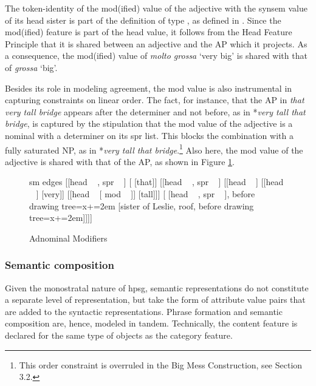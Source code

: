 \documentclass[output=paper]{langsci/langscibook}
\begin{document}
\noindent
The token-identity of the {\sc mod(ified)} value of the adjective
with the {\sc synsem} value of its head sister is part of the 
definition of type , as defined in . 
Since the {\sc mod(ified)} feature is part of the {\sc head} value, it follows from the 
Head Feature Principle that it is shared between an adjective 
and the AP which it projects. As a consequence, the {\sc mod(ified)} value of 
\emph{molto grossa} `very big' is shared with that of \emph{grossa} `big'. 
 
Besides its role in modeling agreement, the {\sc mod} value is also instrumental 
in capturing constraints on linear order.  
The fact, for instance, that the AP in \emph{that very tall bridge} appears 
after the determiner and not before, as in *\emph{very tall that bridge},
is captured by the stipulation that the {\sc mod} value of the adjective 
is a nominal with a determiner on its {\sc spr} list. This blocks the 
combination with a fully saturated NP, as in 
*\emph{very tall that bridge}.\footnote{This order constraint is overruled in 
the Big Mess Construction, see Section 3.2.} Also here, the {\sc mod} value of 
the adjective is shared with that of the AP, as shown in Figure \ref{lea}. 

\begin{figure}
	\centering
	\begin{forest}
sm edges
[{[{\sc head} ~  , {\sc spr} ~ \eliste]}
	[ [that]]
	[{[{\sc head} ~ , {\sc spr} ~ ]}
		[{[{\sc head} ~ ]}
			[{[{\sc head} ~ ]} [very]]
			[{[{\sc head} ~  [ {\sc mod} ~ ]]} [tall]]]
		[{ [{\sc head} ~ , {\sc spr} ~ ]}, before drawing tree={x+=2em} [sister of Leslie, roof, before drawing tree={x+=2em}]]]]
	\end{forest}
	\caption{\label{lea} Adnominal Modifiers}
\end{figure}
 

\subsubsection{Semantic composition}


Given the monostratal nature of {\sc hpsg}, semantic representations 
do not constitute a separate level of representation, but take the form 
of attribute value pairs that are added to the syntactic representations.   
Phrase formation and semantic composition are, hence, modeled in tandem.  
Technically, the {\sc content} feature is declared for the same type of objects 
as the {\sc category} feature. 
\end{document}
